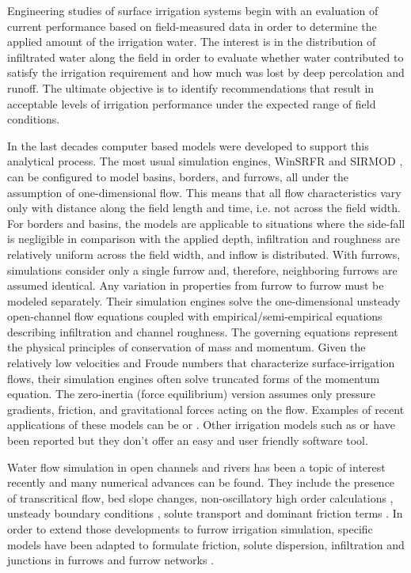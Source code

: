 \documentclass[review,authoryear]{elsarticle}
\begin{document}
Engineering studies of surface irrigation systems begin with an evaluation of
current performance based on field-measured data in order to determine the
applied amount of the irrigation water. The interest is in the distribution of
infiltrated water along the field in order to evaluate whether water contributed
to satisfy the irrigation requirement and how much was lost by deep percolation
and runoff. The ultimate objective is to identify recommendations that result in
acceptable levels of irrigation performance under the expected range of field
conditions.

In the last decades computer based models were developed to support this
analytical process. The most usual simulation engines, WinSRFR
\citep{Clemmens99} and SIRMOD \citep{Walker03}, can be configured to model
basins, borders, and furrows, all under the assumption of one-dimensional flow.
This means that all flow characteristics vary only with distance along the field
length and time, i.e. not across the field width. For borders and basins, the
models are applicable to situations where the side-fall is negligible in
comparison with the applied depth, infiltration and roughness are relatively
uniform across the field width, and inflow is distributed. With furrows,
simulations consider only a single furrow and, therefore, neighboring furrows
are assumed identical. Any variation in properties from furrow to furrow must be
modeled separately. Their simulation engines solve the one-dimensional unsteady
open-channel flow equations coupled with empirical/semi-empirical equations
describing infiltration and channel roughness. The governing equations represent
the physical principles of conservation of mass and momentum. Given the
relatively low velocities and Froude numbers that characterize
surface-irrigation flows, their simulation engines often solve truncated forms
of the momentum equation. The zero-inertia (force equilibrium) version assumes
only pressure gradients, friction, and gravitational forces acting on the flow. 
Examples of recent applications of these models can be
\cite{Bautista09a,Bautista09b} or \cite{EbrahimiamLiaghat11}.
Other irrigation models such as \cite{Mailapalli09} or \cite{Soroush13} have been reported but they don't offer an easy and user friendly software tool.

Water flow simulation in open channels and rivers has been a topic of interest
recently and many numerical advances can be found. They include the presence of
transcritical flow, bed slope changes, non-oscillatory high order calculations
\citep{JaviTVD}, unsteady boundary conditions \citep{JaviContorno}, solute
transport \citep{JaviTrans} and dominant friction terms
\citep{JaviFriccion,JaviFriccion2}. In order to extend those developments to
furrow irrigation simulation, specific models have been adapted to formulate
friction, solute dispersion, infiltration and junctions in furrows and furrow
networks \citep{JaviSurcos1,JaviSurcos2}.
\end{document}
